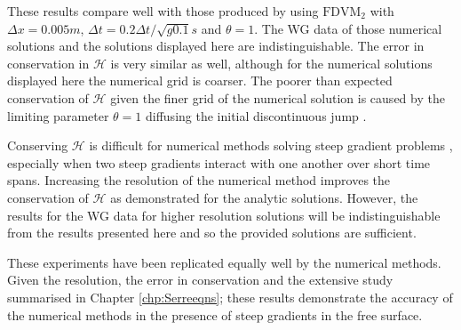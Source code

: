 These results compare well with those produced by \citet{Zoppou-etal-2017} using $\text{FDVM}_2$ with $\Delta x = 0.005m$, $\Delta t = 0.2 \Delta t / \sqrt{g 0.1} s$ and $\theta = 1$. The WG data of those numerical solutions and the solutions displayed here are indistinguishable. The error in conservation in $\mathcal{H}$ is very similar as well, although for the numerical solutions displayed here the numerical grid is coarser. The poorer than expected conservation of $\mathcal{H}$ given the finer grid of the numerical solution is caused by the limiting parameter $\theta = 1$ diffusing the initial discontinuous jump \cite{Pitt-2018-61}.

Conserving $\mathcal{H}$ is difficult for numerical methods solving steep gradient problems \cite{Pitt-2018-61}, especially when two steep gradients interact with one another over short time spans. Increasing the resolution of the numerical method improves the conservation of $\mathcal{H}$ as demonstrated for the analytic solutions. However, the results for the WG data for higher resolution solutions will be indistinguishable from the results presented here and so the provided solutions are sufficient. 

These experiments have been replicated equally well by the numerical methods. Given the resolution, the error in conservation and the extensive study summarised in Chapter \ref{chp:Serreeqns}; these results demonstrate the accuracy of the numerical methods in the presence of steep gradients in the free surface.

